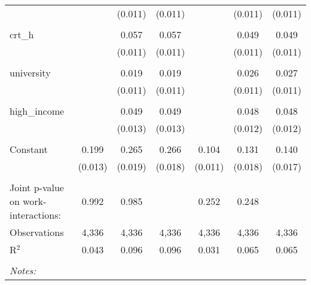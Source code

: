 \begin{table}[!htbp]
\begin{tabular}{@{\extracolsep{5pt}}lcccccc}
  &  & (0.011) & (0.011) &  & (0.011) & (0.011) \\ 
  & & & & & & \\ 
 crt\_h &  & 0.057 & 0.057 &  & 0.049 & 0.049 \\ 
  &  & (0.011) & (0.011) &  & (0.011) & (0.011) \\ 
  & & & & & & \\ 
 university &  & 0.019 & 0.019 &  & 0.026 & 0.027 \\ 
  &  & (0.011) & (0.011) &  & (0.011) & (0.011) \\ 
  & & & & & & \\ 
 high\_income &  & 0.049 & 0.049 &  & 0.048 & 0.048 \\ 
  &  & (0.013) & (0.013) &  & (0.012) & (0.012) \\ 
  & & & & & & \\ 
 Constant & 0.199 & 0.265 & 0.266 & 0.104 & 0.131 & 0.140 \\ 
  & (0.013) & (0.019) & (0.018) & (0.011) & (0.018) & (0.017) \\ 
  & & & & & & \\ 
Joint p-value on work-interactions: & 0.992 & 0.985 &  & 0.252 & 0.248 &  \\ 
Observations & 4,336 & 4,336 & 4,336 & 4,336 & 4,336 & 4,336 \\ 
R$^{2}$ & 0.043 & 0.096 & 0.096 & 0.031 & 0.065 & 0.065 \\ 
\hline \\[-1.8ex] 
\textit{Notes:} & \multicolumn{6}{l}{} \\ 
\end{tabular} 
\end{table} 
